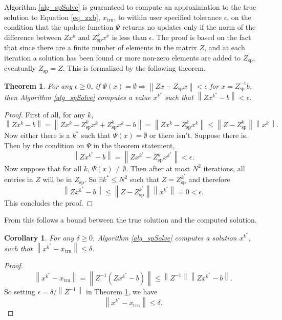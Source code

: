\documentclass{article}
\newcommand{\norm}[1]{\left\lVert #1 \right\rVert}
\newtheorem{theorem}{Theorem}[section]
\newtheorem{corollary}{Corollary}[theorem]
\theoremstyle{plain}
\begin{document}
Algorithm \ref{alg_spSolve} is guaranteed to compute an approximation to the true solution to Equation \ref{eq_zxb}, $x_{\text{tru}}$,
to within user specified tolerance $\epsilon$,
on the condition that the update function $\Psi$ returns no updates only if the norm of the difference between $Zx^k$ and $Z_{\text{sp}}^k x^x$ is less than $\epsilon$.
The proof is based on the fact that since there are a finite number of elements in the matrix $Z$,
and at each iteration a solution has been found or more non-zero elements are added to $Z_{\text{sp}}$, eventually $Z_{\text{sp}}=Z$.
This is formalized by the following theorem.
\begin{theorem}\label{th_conv}
	For any $\epsilon \geq 0$,
	if $\Psi(x)=\emptyset \Rightarrow \norm{Zx-Z_{\text{sp}}x}<\epsilon$ for $x=Z_{\text{sp}}^{-1}b$,
	then Algorithm \ref{alg_spSolve} computes a value $x^{k^*}$ such that $\norm{Zx^{k^*}-b}<\epsilon$.
\end{theorem}
\begin{proof}
	First of all, for any $k$,
	\begin{equation}
		\norm{Zx^k - b} = \norm{Zx^k - Z_{\text{sp}}^k x^k + Z_{\text{sp}}^k x^k - b}
		= \norm{Zx^k - Z_{\text{sp}}^k x^k}
		\leq \norm{Z-Z_{\text{sp}}^k}\norm{x^k}.
	\end{equation}
	Now either there is a $k^*$ such that $\Psi(x)=\emptyset$ or there isn't.
	Suppose there is. Then by the condition on $\Psi$ in the theorem statement,
	\begin{equation}
		\norm{Zx^{k^*} - b} = \norm{Zx^{k^*} - Z_{\text{sp}}^k x^{k^*}} < \epsilon.
	\end{equation}
	Now suppose that for all $k$, $\Psi(x) \ne \emptyset$.
	Then after at most $N^2$ iterations, all entries in $Z$ will be in $Z_{\text{sp}}$.
	So $\exists k^* \leq N^2$ such that $Z = Z_{\text{sp}}^{k^*}$ and therefore
	\begin{equation}
		\norm{Zx^{k^*} - b} \leq \norm{Z-Z_{\text{sp}}^{k^*}}\norm{x^{k^*}} = 0 < \epsilon.
	\end{equation}
	This concludes the proof.
\end{proof}

From this follows a bound between the true solution and the computed solution.
\begin{corollary}
	For any $\delta \geq 0$,
	Algorithm \ref{alg_spSolve} computes a solution $x^{k^*}$,
	such that $\norm{x^{k^*} - x_{\text{tru}}} \leq \delta$.
\end{corollary}
\begin{proof}
\begin{equation}
	\norm{x^{k^*} - x_{\text{tru}}} = \norm{Z^{-1}\left( Zx^{k^*} - b \right)}
	\leq \norm{Z^{-1}} \norm{Zx^{k^*} - b}.
\end{equation}
So setting $\epsilon = \delta / \norm{Z^{-1}}$ in Theorem \ref{th_conv}, we have
\begin{equation}
	\norm{x^{k^*} - x_{\text{tru}}} \leq \delta.
\end{equation}

\end{proof}
\end{document}
